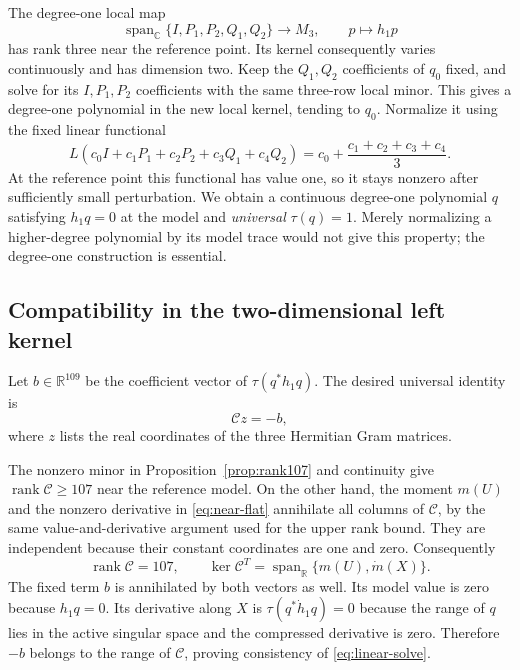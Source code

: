 \documentclass[11pt]{article}
\theoremstyle{remark}\newtheorem{remark}[theorem]{Remark}
\newcommand{\C}{\mathbb C}
\newcommand{\R}{\mathbb R}
\newcommand{\rank}{\operatorname{rank}}
\newcommand{\calC}{\mathcal C}
\begin{document}
The degree-one local map
\[
 \operatorname{span}_{\C}\{I,P_1,P_2,Q_1,Q_2\}\longrightarrow M_3,
 \qquad p\longmapsto h_1p
\]
has rank three near the reference point. Its kernel consequently varies continuously and has dimension two. Keep the $Q_1,Q_2$ coefficients of $q_0$ fixed, and solve for its $I,P_1,P_2$ coefficients with the same three-row local minor. This gives a degree-one polynomial in the new local kernel, tending to $q_0$. Normalize it using the fixed linear functional
\begin{equation}\label{eq:universal-trace-q}
 L(c_0I+c_1P_1+c_2P_2+c_3Q_1+c_4Q_2)
 =c_0+\frac{c_1+c_2+c_3+c_4}{3}.
\end{equation}
At the reference point this functional has value one, so it stays nonzero after sufficiently small perturbation. We obtain a continuous degree-one polynomial $q$ satisfying $h_1q=0$ at the model and \emph{universal} $\tau(q)=1$. Merely normalizing a higher-degree polynomial by its model trace would not give this property; the degree-one construction is essential.

\subsection{Compatibility in the two-dimensional left kernel}
Let $b\in\R^{109}$ be the coefficient vector of $\tau(q^*h_1q)$. The desired universal identity is
\begin{equation}\label{eq:linear-solve}
 \calC z=-b,
\end{equation}
where $z$ lists the real coordinates of the three Hermitian Gram matrices.

The nonzero minor in Proposition~\ref{prop:rank107} and continuity give $\rank\calC\ge107$ near the reference model. On the other hand, the moment $m(U)$ and the nonzero derivative in \eqref{eq:near-flat} annihilate all columns of $\calC$, by the same value-and-derivative argument used for the upper rank bound. They are independent because their constant coordinates are one and zero. Consequently
\[
 \rank\calC=107,\qquad
 \ker\calC^T=\operatorname{span}_{\R}\{m(U),\dot m(X)\}.
\]
The fixed term $b$ is annihilated by both vectors as well. Its model value is zero because $h_1q=0$. Its derivative along $X$ is $\tau(q^*\dot h_1q)=0$ because the range of $q$ lies in the active singular space and the compressed derivative is zero. Therefore $-b$ belongs to the range of $\calC$, proving consistency of \eqref{eq:linear-solve}.
\end{document}
